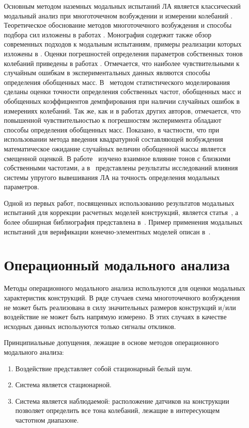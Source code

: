 Основным методом наземных модальных испытаний ЛА является классический модальный анализ при многоточечном возбуждении и измерении колебаний \fixme{[1]}. Теоретическое обоснование методов многоточечного возбуждения и способы подбора сил изложены в работах \fixme{[2–7]}. Монография \fixme{[6]} содержит также обзор современных подходов к модальным испытаниям, примеры реализации которых изложены в \fixme{[8–12]}. Оценки погрешностей определения параметров собственных тонов колебаний приведены в работах \fixme{[5, 13–15]}. Отмечается, что наиболее чувствительными к случайным ошибкам в экспериментальных данных являются способы определения обобщенных масс. В~\fixme{[16]} методом статистического моделирования сделаны оценки точности определения собственных частот, обобщенных масс и обобщенных коэффициентов демпфирования при наличии случайных ошибок в измерениях колебаний. Так же, как и в работах других авторов, отмечается, что повышенной чувствительностью к погрешностям эксперимента обладают способы определения обобщенных масс. Показано, в частности, что при использовании метода введения квадратурной составляющей возбуждения математическое ожидание случайных величин обобщенной массы является смещенной оценкой. В работе~\fixme{[17]} изучено взаимное влияние тонов с близкими собственными частотами, а в~\fixme{[18]} представлены результаты исследований влияния системы упругого вывешивания ЛА на точность определения модальных параметров. 

Одной из первых работ, посвященных использованию результатов модальных испытаний для коррекции расчетных моделей конструкций, является статья~\fixme{[19]}, а более обширная библиография представлена в~\fixme{[6]}. Пример применения модальных испытаний для верификации конечно-элементных моделей описан в~\fixme{[20]}.

\section{Операционный модального анализа}

Методы операционного модального анализа используются для оценки модальных характеристик конструкций. В ряде случаев схема многоточечного возбуждения не может быть реализована в силу значительных размеров конструкций и/или воздействие не может быть напрямую измерено. В этих случаях в качестве исходных данных используются только сигналы откликов. 

Принципиальные допущения, лежащие в основе методов операционного модального анализа:
\begin{enumerate}[noitemsep]
	\item Воздействие представляет собой стационарный белый шум.
	\item Система является стационарной.
	\item Система является наблюдаемой: расположение датчиков на конструкции позволяет определить все тона колебаний, лежащие в интересующем частотном диапазоне. 
\end{enumerate}


